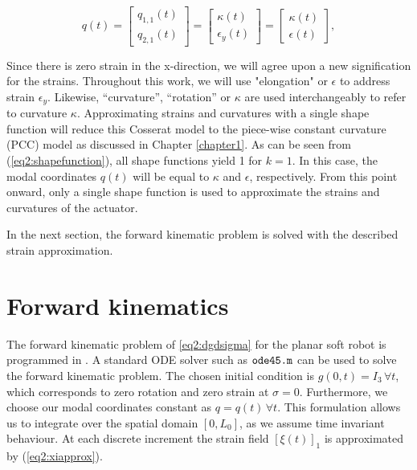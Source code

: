 \begin{equation}
q(t) = \begin{bmatrix} q_{1,1}(t) \\ q_{2,1}(t) \end{bmatrix} = \begin{bmatrix} \kappa(t) \\ \epsilon_y(t) \end{bmatrix} = \begin{bmatrix} \kappa(t) \\ \epsilon(t) \end{bmatrix},
\end{equation}

Since there is zero strain in the x-direction, we will agree upon a new signification for the strains. Throughout this work, we will use "elongation" or $\epsilon$ to address strain $\epsilon_y$. Likewise, ``curvature'', ``rotation'' or  $\kappa$ are used interchangeably to refer to curvature $\kappa$. Approximating strains and curvatures with a single shape function will reduce this Cosserat model to the piece-wise constant curvature (PCC) model as discussed in Chapter \ref{chapter1}. As can be seen from (\ref{eq2:shapefunction}), all shape functions yield 1 for $k=1$. In this case, the modal coordinates $q(t)$ will be equal to $\kappa$ and $\epsilon$, respectively. From this point onward, only a single shape function is used to approximate the strains and curvatures of the actuator. 

In the next section, the forward kinematic problem is solved with the described strain approximation.




\section{Forward kinematics}

The forward kinematic problem of \ref{eq2:dgdsigma} for the planar soft robot is programmed in \MATLAB \cite{MATLAB2020}. A standard ODE solver such as $\verb+ode45.m+$ can be used to solve the forward kinematic problem. The chosen initial condition is $g(0,t) = I_3 \hspace{2pt} \forall t$, which corresponds to zero rotation and zero strain at $\sigma = 0$. Furthermore, we choose our modal coordinates constant as $q = q(t) \hspace{2pt} \forall t$. This formulation allows us to integrate over the spatial domain $[0,L_0]$, as we assume time invariant behaviour. At each discrete increment the strain field $[\xi(t)]_1$ is approximated by (\ref{eq2:xiapprox}). 

